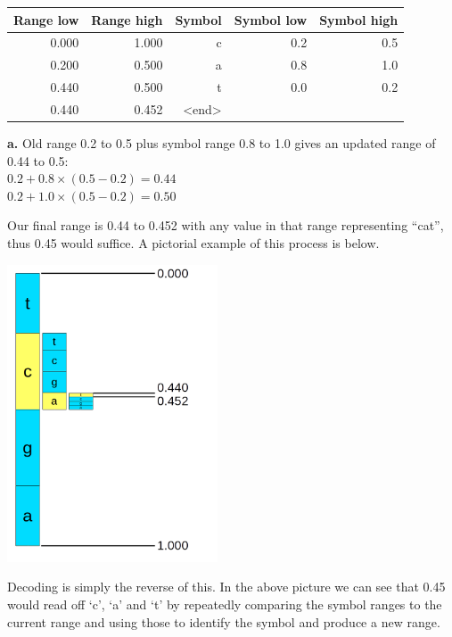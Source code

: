 \documentclass[a4paper]{article}
\begin{document}
\begin{threeparttable}[t]
\begin{tabular}{rrrrr}
\hline
\textbf{Range low} & \textbf{Range high} & \textbf{Symbol} & \textbf{Symbol low} & \textbf{Symbol high}\\
\hline
0.000 & 1.000 & c & 0.2 & 0.5\\
0.200 & 0.500 & a & 0.8 & 1.0\\
0.440\tnote{\textbf{a}} & 0.500\tnote{\textbf{a}} & t & 0.0 & 0.2\\
0.440 & 0.452 & <end>\\
\hline
\end{tabular}
\begin{tablenotes}
\item{\textbf{a.}} Old range 0.2 to 0.5 plus symbol range 0.8 to 1.0 gives an updated range of 0.44 to 0.5:\\
 $0.2 + 0.8\times(0.5-0.2) = 0.44$\\
$0.2 + 1.0\times(0.5-0.2) = 0.50$
\end{tablenotes}
\end{threeparttable}

Our final range is 0.44 to 0.452 with any value in that range representing
``cat'', thus 0.45 would suffice.  A pictorial example of this process is below.

\includegraphics[height=250pt, keepaspectratio=true]{img/range_code.png}

Decoding is simply the reverse of this.  In the above picture we can see that 0.45 would read off `c', `a' and `t' by repeatedly comparing the symbol ranges to the current range and using those to identify the symbol and produce a new range.
\end{document}

